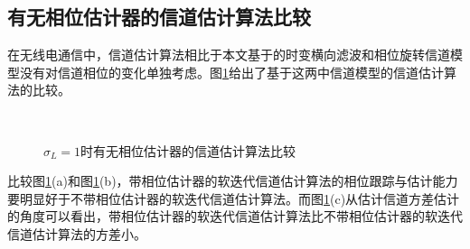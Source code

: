 \subsection{有无相位估计器的信道估计算法比较}
在无线电通信中，信道估计算法相比于本文基于的时变横向滤波和相位旋转信道模型没有对信道相位的变化单独考虑。图\ref{fig:4.6}给出了基于这两中信道模型的信道估计算法的比较。
\begin{figure}
    \centering
    \\
    \caption{$\sigma_L=1$时有无相位估计器的信道估计算法比较}
    \label{fig:4.6}
\end{figure}
比较图\ref{fig:4.6}(a)和图\ref{fig:4.6}(b)，带相位估计器的软迭代信道估计算法的相位跟踪与估计能力要明显好于不带相位估计器的软迭代信道估计算法。而图\ref{fig:4.6}(c)从估计信道方差估计的角度可以看出，带相位估计器的软迭代信道估计算法比不带相位估计器的软迭代信道估计算法的方差小。

